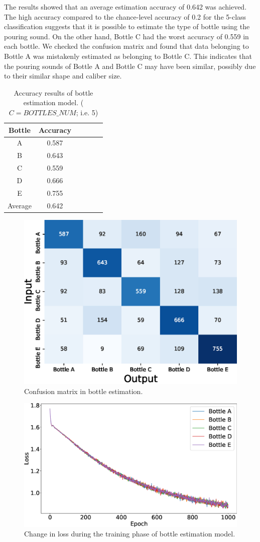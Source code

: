 \documentclass[sigconf]{acmart}
\begin{document}
The results showed that an average estimation accuracy of 0.642 was achieved. The high accuracy compared to the chance-level accuracy of 0.2 for the 5-class classification suggests that it is possible to estimate the type of bottle using the pouring sound. On the other hand, Bottle C had the worst accuracy of 0.559 in each bottle. We checked the confusion matrix and found that data belonging to Bottle A was mistakenly estimated as belonging to Bottle C. This indicates that the pouring sounds of Bottle A and Bottle C may have been similar, possibly due to their similar shape and caliber size.

\begin{table}[!t]
  \centering
  \caption{Accuracy results of bottle estimation model. ($C=BOTTLES\_NUM$; i.e. 5)}
  \begin{tabular}{c|ccccc} \hline\hline
    Bottle & Accuracy \\ \hline
    A & 0.587 \\
    B & 0.643 \\
    C & 0.559 \\
    D & 0.666 \\
    E & 0.755 \\ \hline
    Average & 0.642 \\ \hline
  \end{tabular}
  \label{tab:result_5}
\end{table}

\begin{figure}[!t]
  \centering
  \includegraphics[width=0.5\linewidth]{figures/confusion_matrix_5.eps}
  \caption{Confusion matrix in bottle estimation.}
  \label{fig:confusion_matrix_5}
\end{figure}

\begin{figure}[!t]
  \centering
  \includegraphics[width=0.6\linewidth]{figures/loss_5.eps}
  \caption{Change in loss during the training phase of bottle estimation model.}
  \label{fig:loss}
\end{figure}
\end{document}
